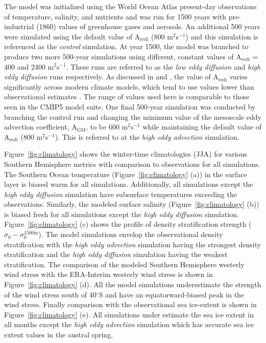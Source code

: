 The model was initialized using the World Ocean Atlas present-day observations of
temperature, salinity, and nutrients and was run for 1500 years with
pre-industrial (1860) values of greenhouse gases and aerosols. An additional 500
years were simulated using the default value of A$_{\mathrm{redi}}$
(800 m$^2$s$^{-1}$) and this simulation is referenced as the \textit{control}
simulation. At year 1500, the model was branched to produce two more
500-year simulations using different, constant values of
A$_{\mathrm{redi}}$ = 400 and 2400 m$^2$s$^{-1}$.
These runs are referred to as the \textit{low eddy diffusion} and
\textit{high eddy diffusion} runs respectively. As discussed in
\citet{Pradal2014} and \citet{AnandGnanadesikan2015}, the value of
A$_{\mathrm{redi}}$ varies significantly across modern climate models, which
tend to use values lower than observational estimates \citep{Ollitrault2002}.
The range of values used here is comparable to those seen in the CMIP5 model
suite. One final 500-year simulation was conducted by branching the control run
and changing the minimum value of the mesoscale eddy advection coefficient,
A$_{\mathrm{GM}}$, to be 600 m$^2$s$^{-1}$ while maintaining the default value
of A$_{\mathrm{redi}}$ (800 m$^2$s$^{-1}$). This is referred to at the
\textit{high eddy advection} simulation.

Figure~\ref{fig:climatology} shows the winter-time climatologies (JJA) for various
Southern Hemisphere metrics with comparison to observations for all simulations.
The Southern Ocean temperature (Figure~\ref{fig:climatology} (a)) in the surface
layer is biased warm for all simulations. Additionally, all simulations except
the \textit{high eddy diffusion} simulation have subsurface temperatures exceeding
the observations. Similarly, the modeled surface salinity
(Figure~\ref{fig:climatology} (b)) is biased fresh for all simulations except the
\textit{high eddy diffusion} simulation. Figure~\ref{fig:climatology} (c) shows the
profile of density stratification strength ($\sigma_0 - \sigma_0^{\mathrm{1500m}}$).
The model simulations envelop the observational density stratification with the
\textit{high eddy advection} simulation having the strongest density
stratification and the \textit{high eddy diffusion} simulation having the weakest
stratification. The comparison of the modeled Southern Hemisphere westerly
wind stress with the ERA-Interim westerly wind stress is shown in
Figure~\ref{fig:climatology} (d). All the model simulations underestimate the
strength of the wind stress south of 40$^{\circ}$S and have an equatorward-biased
peak in the wind stress. Finally comparison with the observational sea ice-extent
is shown in Figure~\ref{fig:climatology} (e). All simulations under estimate the
sea ice extent in all months except the \textit{high eddy advection} simulation
which has accurate sea ice extent values in the austral spring.

